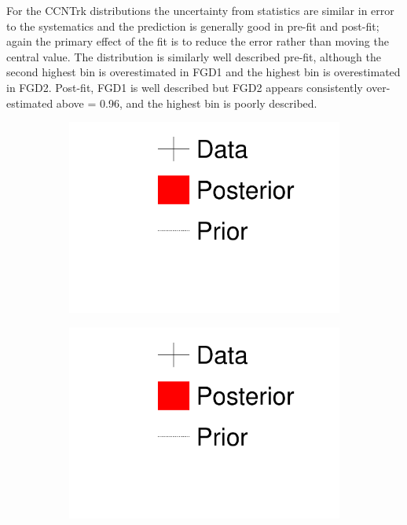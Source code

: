 For the CCNTrk distributions the uncertainty from statistics are similar in error to the systematics and the prediction is generally good in \pmu pre-fit and post-fit; again the primary effect of the fit is to reduce the error rather than moving the central value. The \cosmu distribution is similarly well described pre-fit, although the second highest \cosmu bin is overestimated in FGD1 and the highest \cosmu bin is overestimated in FGD2. Post-fit, FGD1 is well described but FGD2 appears consistently over-estimated above \cosmu= 0.96, and the highest \cosmu bin is poorly described.
\begin{figure}[h]
	\begin{subfigure}[t]{0.2\textwidth}
		\includegraphics[width=\textwidth, trim={0mm 90mm 0mm 0mm}, clip,page=1]{figures/mach3/1D_legend_Data_Posterior_Prior}
	\end{subfigure}
	\begin{subfigure}[t]{0.2\textwidth}
		\includegraphics[width=\textwidth, trim={0mm 45mm 0mm 50mm}, clip,page=1]{figures/mach3/1D_legend_Data_Posterior_Prior}

\end{subfigure}
\end{figure}
